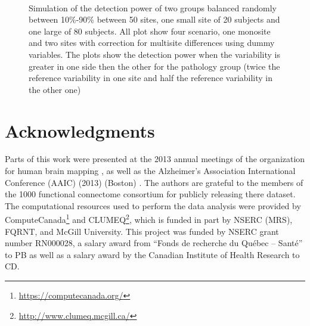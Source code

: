 \documentclass[authoryear]{elsarticle}
\begin{document}
\begin{figure}[t]
   \centering
    \captionsetup[subfloat]{labelformat=empty}
     \\
     \tiny Simulation of the detection power of two groups balanced randomly between 10\%-90\% between 50 sites, one small site of 20 subjects and one large of 80 subjects. All plot show four scenario, one monosite and two sites with correction for multisite differences using dummy variables. The plots show the detection power when the variability is greater in one side then the other for the pathology group (twice the reference variability in one site and half the reference variability in the other one)
\end{figure}
 






\section{Acknowledgments}
Parts of this work were presented at the 2013 annual meetings of the organization for human brain mapping \citep{Dansereau2013}, as well as the  Alzheimer's Association International Conference (AAIC) (2013) (Boston) \citep{Dansereau2013a}. The authors are grateful to the members of the 1000 functional connectome consortium for publicly releasing there dataset. The computational resources used to perform the data analysis were provided by ComputeCanada\footnote{\url{https://computecanada.org/}} and CLUMEQ\footnote{\url{http://www.clumeq.mcgill.ca/}}, which is funded in part by NSERC (MRS), FQRNT, and McGill University. This project was funded by NSERC grant number RN000028, a salary award from ``Fonds de recherche du Qu\'ebec -- Sant\'e'' to PB as well as a salary award by the Canadian Institute of Health Research to CD.
\end{document}
